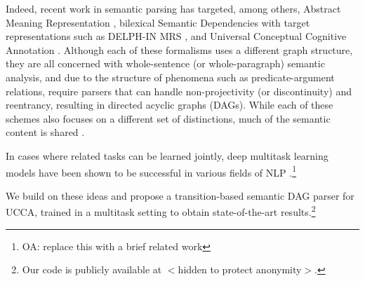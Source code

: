 \documentclass[11pt,a4paper]{article}
\newcommand{\oa}[1]{\footnote{\color{red}OA: #1}}
\begin{document}
Indeed, recent work in semantic parsing has targeted, among others,
Abstract Meaning Representation \cite[AMR;][]{banarescu2013abstract,damonte-17,11099},
bilexical Semantic Dependencies \cite[SDP;][]{oepen2014semeval,oepen2015semeval,oepen2016towards,P17-1186}
with target representations such as DELPH-IN MRS \cite[DM;][]{flickinger2012deepbank},
and Universal Conceptual Cognitive Annotation \cite[UCCA;][]{abend2013universal,hershcovich2017a}.
Although each of these formalisms uses a different graph structure,
they are all concerned with whole-sentence (or whole-paragraph) semantic analysis,
and due to the structure of phenomena such as predicate-argument relations,
require parsers that can handle non-projectivity (or discontinuity) and reentrancy, resulting in
directed acyclic graphs (DAGs).
While each of these schemes also focuses on a different set of distinctions,
much of the semantic content is shared \cite{abend2017state}.

In cases where related tasks can be learned jointly,
deep multitask learning models have been shown to be successful in various fields of NLP
\cite{collobert2008unified,Zhang2016StackpropagationIR,P17-1186,swayamdipta2017frame,guo2016exploiting}.\oa{replace this with a brief
related work}

We build on these ideas and propose a transition-based semantic DAG parser for UCCA,
trained in a multitask setting to obtain state-of-the-art 
results.\footnote{Our code is publicly available at $<$hidden to protect anonymity$>$.}
\end{document}
